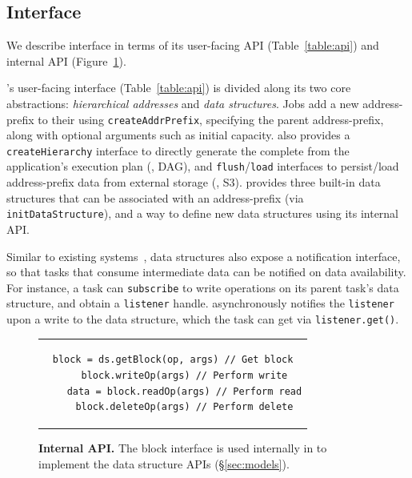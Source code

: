 \subsection{\jiffy Interface}
\label{ssec:jiffyapi}


We describe \jiffy interface in terms of its user-facing API (Table~\ref{table:api}) and internal API (Figure~\ref{fig:blockapi}).

 \jiffy's user-facing interface (Table~\ref{table:api}) is divided along its two core abstractions: \textit{hierarchical addresses} and \textit{data structures}. Jobs add a new address-prefix to their \lh using \texttt{createAddrPrefix}, specifying the parent address-prefix, along with optional arguments such as initial capacity. \jiffy also provides a \texttt{createHierarchy} interface to directly generate the complete \lh from the application's execution plan (\ie, DAG), and \texttt{flush}/\texttt{load} interfaces to persist/load address-prefix data from external storage (\eg, S3). \jiffy provides three built-in data structures that can be associated with an address-prefix (via \texttt{initDataStructure}), and a way to define new data structures using its internal API. 

Similar to existing systems~\cite{redis, sns}, data structures also expose a notification interface, so that tasks that consume intermediate data can be notified on data availability. For instance, a task can \texttt{subscribe} to write operations on its parent task's data structure, and obtain a \texttt{listener} handle. \jiffy asynchronously notifies the \texttt{listener} upon a write to the data structure, which the task can get via \texttt{listener.get()}.

\begin{figure}[h]
  \centering
  \begin{tabular}{c}
  {\begin{lstlisting}[frame=single, gobble=4, linewidth=20em]
    block = ds.getBlock(op, args) // Get block
    block.writeOp(args) // Perform write
    data = block.readOp(args) // Perform read
    block.deleteOp(args) // Perform delete
  \end{lstlisting}}
  \end{tabular}
  \caption[\jiffy Internal API]{\textbf{\jiffy Internal API.} The block interface is used internally in \jiffy to implement the data structure APIs (\S\ref{sec:models}).}  
  \label{fig:blockapi}
\end{figure}

